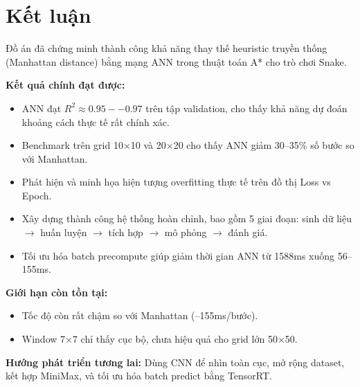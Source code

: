 \documentclass[12pt,a4paper]{article}
\begin{document}
\newpage

\section{Kết luận}

Đồ án đã chứng minh thành công khả năng thay thế heuristic truyền thống (Manhattan distance) bằng mạng ANN trong thuật toán A* cho trò chơi Snake.

\textbf{Kết quả chính đạt được:}

\begin{itemize}
    \item ANN đạt $R^2 \approx 0.95--0.97$ trên tập validation, cho thấy khả năng dự đoán khoảng cách thực tế rất chính xác.
    \item Benchmark trên grid 10×10 và 20×20 cho thấy ANN giảm 30--35\% số bước so với Manhattan.
    \item Phát hiện và minh họa hiện tượng overfitting thực tế trên đồ thị Loss vs Epoch.
    \item Xây dựng thành công hệ thống hoàn chỉnh, bao gồm 5 giai đoạn: sinh dữ liệu $\rightarrow$ huấn luyện $\rightarrow$ tích hợp $\rightarrow$ mô phỏng $\rightarrow$ đánh giá.
    \item Tối ưu hóa batch precompute giúp giảm thời gian ANN từ 1588ms xuống 56--155ms.
\end{itemize}

\textbf{Giới hạn còn tồn tại:}

\begin{itemize}
    \item Tốc độ còn rất chậm so với Manhattan (--155ms/bước).
    \item Window 7×7 chỉ thấy cục bộ, chưa hiệu quả cho grid lớn 50×50.
\end{itemize}

\textbf{Hướng phát triển tương lai:} Dùng CNN để nhìn toàn cục, mở rộng dataset, kết hợp MiniMax, và tối ưu hóa batch predict bằng TensorRT.

\newpage
\end{document}
